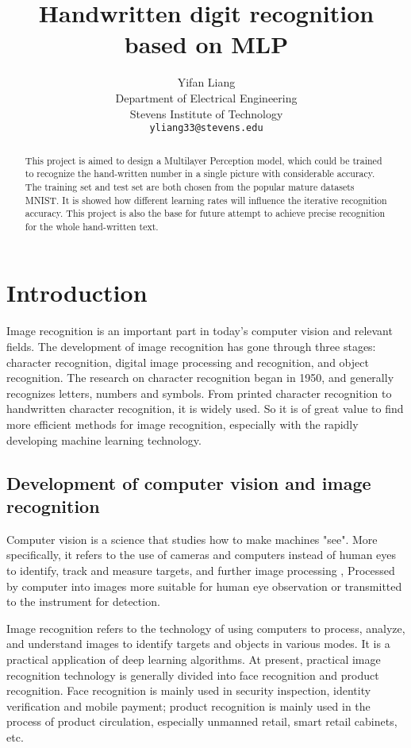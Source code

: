 \documentclass{article}
\title{ Handwritten digit recognition based on MLP}
\author{%
  Yifan Liang \\
  Department of Electrical Engineering\\
  Stevens Institute of Technology\\
  
  \texttt{yliang33@stevens.edu} \\
}
\begin{document}

\maketitle

\begin{abstract}
  This project is aimed to design a Multilayer Perception model, which could be trained to recognize the hand-written number in a single picture with considerable accuracy. The training set and test set are both chosen from the popular mature datasets MNIST. It is showed how different learning rates will influence the iterative recognition accuracy. This project is also the base for future attempt to achieve precise recognition for the whole hand-written text.
\end{abstract}

\section{Introduction}

Image recognition is an important part in today's computer vision and relevant fields. The development of image recognition has gone through three stages: character recognition, digital image processing and recognition, and object recognition. The research on character recognition began in 1950, and generally recognizes letters, numbers and symbols. From printed character recognition to handwritten character recognition, it is widely used. So it is of great value to find more efficient methods for image recognition, especially with the rapidly developing machine learning technology. 



\subsection{Development of computer vision and image recognition}

Computer vision is a science that studies how to make machines "see". More specifically, it refers to the use of cameras and computers instead of human eyes to identify, track and measure targets, and further image processing 
, Processed by computer into images more suitable for human eye observation or transmitted to the instrument for detection.

Image recognition refers to the technology of using computers to process, analyze, and understand images to identify targets and objects in various modes. It is a practical application of deep learning algorithms. 
At present, practical image recognition technology is generally divided into face recognition and product recognition. Face recognition is mainly used in security inspection, identity verification and mobile payment; product recognition is mainly used in the process of product circulation, especially unmanned retail, smart retail cabinets, etc. 
\end{document}
